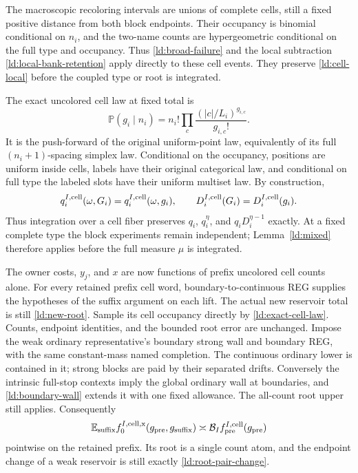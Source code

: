 The macroscopic recoloring intervals are unions of complete cells,
still a fixed positive distance from both block endpoints.  Their
occupancy is binomial conditional on \(n_i\), and the two-name
counts are hypergeometric conditional on the full type and occupancy.
Thus \eqref{ld:broad-failure} and the local subtraction
\eqref{ld:local-bank-retention} apply directly to these cell events.
They preserve \eqref{ld:cell-local} before the coupled type or
root is integrated.

The exact uncolored cell law at fixed total is
\begin{equation}
 \mathbb P(g_i\mid n_i)
       =n_i!\prod_c\frac{(|c|/L_i)^{g_{i,c}}}{g_{i,c}!}.
 \label{ld:exact-cell-law}
\end{equation}
It is the push-forward of the original uniform-point law, equivalently
of its full \((n_i+1)\)-spacing simplex law.  Conditional on the
occupancy, positions are uniform inside cells, labels have their
original categorical law, and conditional on full type the labeled
slots have their uniform multiset law.  By construction,
\[
 q_i^{I,\rm cell}(\omega,G_i)
        =q_i^{I,\rm cell}(\omega,g_i),\qquad
 D_i^{I,\rm cell}(G_i)=D_i^{I,\rm cell}(g_i).
\]
Thus integration over a cell fiber preserves \(q_i\),
\(q_i^\eta\), and \(q_iD_i^{\eta-1}\) exactly.  At a fixed
complete type the block experiments remain independent; Lemma~\ref{ld:mixed} therefore applies before
the full measure \(\mu\) is integrated.

The owner costs, \(y_j\), and \(x\) are now functions of prefix
uncolored cell counts alone.  For every retained prefix cell word,
boundary-to-continuous REG supplies the hypotheses of the suffix
argument on each lift.  The actual new reservoir total is still
\eqref{ld:new-root}.  Sample its cell occupancy directly by
\eqref{ld:exact-cell-law}.  Counts, endpoint identities, and the
bounded root error are unchanged.  Impose the weak ordinary
representative's boundary strong wall and boundary REG, with the
same constant-mass named completion.  The continuous ordinary
lower is contained in it; strong blocks are paid by their separated
drifts.  Conversely the intrinsic full-stop contexts imply the
global ordinary wall at boundaries, and
\eqref{ld:boundary-wall} extends it with one fixed allowance.
The all-count root upper still applies.  Consequently
\begin{equation}
 \mathbb E_{\rm suffix}f_0^{I,\rm cell,x}
       (g_{\rm pre},g_{\rm suffix})
       \asymp\mathcal B_I f_{\rm pre}^{I,\rm cell}(g_{\rm pre})
 \label{ld:cell-root-kernel}
\end{equation}
pointwise on the retained prefix.  Its root is a single count atom,
and the endpoint change of a weak reservoir is still exactly
\eqref{ld:root-pair-change}.

